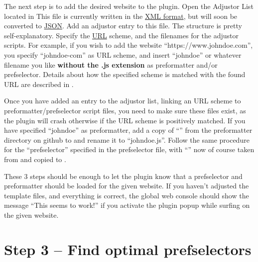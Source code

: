 \documentclass[
a4paper,
12pt,
]
{article}
\begin{document}
The next step is to add the desired website to the plugin. Open the Adjustor List located in
This file is currently written in the \href{https://en.wikipedia.org/wiki/XML}{XML format}, but will soon be converted to \href{https://en.wikipedia.org/wiki/JSON}{JSON}. Add an adjustor entry to this file. The structure is pretty self-explanatory. Specify the \href{https://en.wikipedia.org/wiki/URL}{URL} scheme, and the filenames for the adjustor scripts. For example, if you wish to add the website ``https://www.johndoe.com'', you specify ``johndoe-com'' as URL scheme, and insert ``johndoe'' or whatever filename you like \textbf{without the .js extension} as preformatter and/or prefselector. Details about how the specified scheme is matched with the found URL are described in .\par

Once you have added an entry to the adjustor list, linking an URL scheme to preformatter/prefselector script files, you need to make sure these files exist, as the plugin will crash otherwise if the URL scheme is positively matched. If you have specified ``johndoe'' as preformatter, add a copy of ``\tmpl'' from the preformatter directory on github 
to 
and rename it to ``johndoe.js''. Follow the same procedure for the ``prefselector'' specified in the  prefselector file, with ``\tmpl'' now of course taken from 
and copied to
.

These 3 steps should be enough to let the plugin know that a prefselector and preformatter should be loaded for the given website. If you haven't adjusted the template files, and everything is correct, the global web console should show the message ``This seems to work!'' if you activate the plugin popup while surfing on the given website.
% 
\section{Step 3 -- Find optimal prefselectors}\label{sec_3}
 
\end{document}
